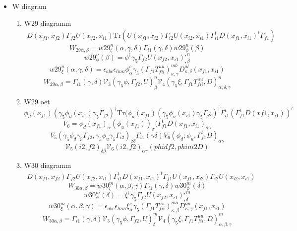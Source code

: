 \documentclass{article}[12pt]
\begin{document}
\begin{itemize}
\begin{enumerate}
\end{enumerate}
\item W diagram
\begin{enumerate}
\item W29 diagramm
\begin{eqnarray}
D(x_{f1},x_{f2})\Gamma_{f2}U(x_{f2},x_{i1})\mathrm{Tr}\left(U\left(x_{f1},x_{i2}\right)\Gamma_{i2}U(x_{i2},x_{i1})\Gamma_{i1}^tD(x_{f1},x_{i1})^t\Gamma_{f1}\right)
\end{eqnarray}
$$
W_{29\alpha,\beta}=w29_{\xi}^{n}\left(\alpha,\gamma,\delta\right)\Gamma_{i1}\left(\gamma,\delta\right)w29_{\phi}^{n}\left(\beta\right)
$$
$$
w29_{\phi}^{n}\left(\beta\right)=\phi^{\dagger}\gamma_5\Gamma_{f2}U\left(x_{f2},x_{i1}\right)^{,n}_{,\beta}
$$
$$
w29_{\xi}^{n}\left(\alpha,\gamma,\delta\right)=\epsilon_{abc}\epsilon_{lmn}\phi^{c}_{\alpha}\gamma_5\left(\Gamma_{f1}T_{fii}^{uu}\right)^{mb}_{\kappa,\gamma}D^{al}_{\kappa,\delta}\left(x_{f1},x_{i1}\right)
$$
$$
W_{29\alpha,\beta}=\Gamma_{i1}\left(\gamma,\delta\right){\mathcal V}_{3}\left(\gamma_5\phi,\Gamma_{f2},U\right)^{n}_{\beta}{\mathcal V}_{4}\left(\gamma_5\xi,\Gamma_{f1}T_{fii}^{uu},D\right)^{n}_{\alpha,\delta,\gamma}
$$
\item W29 oet
$$
\phi_d(x_{f1})(\gamma_5\phi_d(x_{i1})\gamma_5\Gamma_{f2})^\dagger
\mathrm{Tr}(\phi_u(x_{f1})(\gamma_5\phi_u(x_{i1})\gamma_5\Gamma_{i2})^\dagger \Gamma_{i1}^t(\Gamma_{f1}^tD(x{f1},x_{i1}))^t
$$
$$
V_6=\phi_d(x_{f1})_{\alpha}(\phi_u(x_{f1}))_{\sigma}(\Gamma_{f1}^tD(x_{f1},x_{i1})_{\sigma\gamma}
$$
$$
V_5(\gamma_5\phi_d\gamma_5\Gamma_{f2},\gamma_5\phi_u\gamma_5\Gamma_{i2})_{\beta\delta}\Gamma_{i1}(\gamma\delta)V_6(\phi_d;\phi_u,\Gamma_{f1}^tD)_{\alpha\gamma}
$$
$$
{\mathcal V}_5(i2,f2)_{\delta\beta}{\mathcal V}_6(i2,f2)_{\alpha\gamma}(phidf2,phiui2D)
$$
\item W30 diagramm
\begin{eqnarray}
D(x_{f1},x_{f2})\Gamma_{f2}U(x_{f2},x_{i1})\Gamma_{i1}^tD(x_{f1},x_{i1})^t\Gamma_{f1}U(x_{f1},x_{i2})\Gamma_{i2}U(x_{i2},x_{i1})
\end{eqnarray}
$$
W_{30\alpha,\beta}=w30_{\xi}^{m}\left(\alpha,\beta,\gamma\right)\Gamma_{i1}\left(\gamma,\delta\right)w30_{\phi}^{m}\left(\delta\right)
$$
$$
w30_{\phi}^{m}\left(\delta\right)=\xi^{\dagger}\gamma_5\Gamma_{f2}U\left(x_{f2},x_{i1}\right)^{,m}_{,\delta}
$$
$$
w30_{\xi}^{m}\left(\alpha,\beta,\gamma\right)=\epsilon_{abc}\epsilon_{lmn}\xi^{c}_{\alpha}\gamma_5\left(\Gamma_{f1}T_{fii}^{uu}\right)^{ma}_{\kappa,\beta}D^{an}_{\kappa,\gamma}\left(x_{f1},x_{i1}\right)
$$
$$
W_{30\alpha,\beta}=\Gamma_{i1}\left(\gamma,\delta\right){\mathcal V}_{3}\left(\gamma_5\phi,\Gamma_{f2},U\right)^{m}_{\delta}{\mathcal V}_{4}\left(\gamma_5\xi,\Gamma_{f1}T_{fii}^{uu},D\right)^{m}_{\alpha,\beta,\gamma}
$$
\end{enumerate}
\end{itemize}
\end{document}
